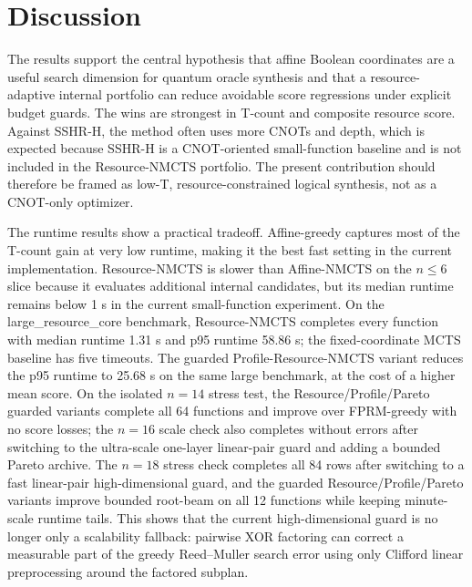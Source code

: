\documentclass[11pt]{article}
\newcommand{\method}{Resource-NMCTS}
\newcommand{\affinemethod}{Affine-NMCTS}
\newcommand{\profilemethod}{Profile-Resource-NMCTS}
\newcommand{\largedataset}{large\_resource\_core}
\newcommand{\megadataset}{mega\_highdim\_resource}
\begin{document}
\begin{table}[t]
\centering
\small
\caption{Mean logical resources on the \megadataset{} $n=18$ stress check.}
\label{tab:mega-resources}

\end{table}

\begin{table}[t]
\centering
\small
\caption{Runtime distribution on the \megadataset{} $n=18$ stress check.}
\label{tab:mega-runtime}

\end{table}

\section{Discussion}

The results support the central hypothesis that affine Boolean coordinates are
a useful search dimension for quantum oracle synthesis and that a
resource-adaptive internal portfolio can reduce avoidable score regressions
under explicit budget guards.
The wins are strongest in T-count and composite resource score.  Against
SSHR-H, the method often uses more CNOTs and depth, which is expected because
SSHR-H is a CNOT-oriented small-function baseline and is not included in the
\method{} portfolio.  The present contribution should therefore be framed as
low-T, resource-constrained logical synthesis, not as a CNOT-only optimizer.

The runtime results show a practical tradeoff.  Affine-greedy captures most of
the T-count gain at very low runtime, making it the best fast setting in the
current implementation.  \method{} is slower than \affinemethod{} on the
$n\leq 6$ slice because it evaluates additional internal candidates, but its
median runtime remains below 1 s in the current small-function experiment.  On
the \largedataset{} benchmark, \method{} completes every function with median
runtime 1.31 s and p95 runtime 58.86 s; the fixed-coordinate MCTS baseline has
five timeouts.  The guarded \profilemethod{} variant reduces the p95 runtime to
25.68 s on the same large benchmark, at the cost of a higher mean score.  On
the isolated $n=14$ stress test, the Resource/Profile/Pareto guarded variants
complete all 64 functions and improve over FPRM-greedy with no score losses;
the $n=16$ scale check also completes without errors after switching to the
ultra-scale one-layer linear-pair guard and adding a bounded Pareto archive.
The $n=18$ stress check completes all 84 rows after switching to a fast
linear-pair high-dimensional guard, and the guarded Resource/Profile/Pareto
variants improve bounded root-beam on all 12 functions while keeping
minute-scale runtime tails.  This shows that
the current high-dimensional guard is no longer only a scalability fallback:
pairwise XOR factoring can correct a measurable part of the greedy
Reed--Muller search error using only Clifford linear preprocessing around the
factored subplan.
\end{document}
